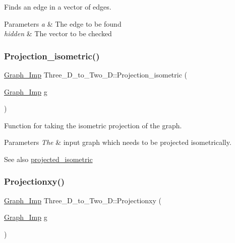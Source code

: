 Finds an edge in a vector of edges. 


\begin{DoxyParams}{Parameters}
{\em a} & The edge to be found \\
\hline
{\em hidden} & The vector to be checked \\
\hline
\end{DoxyParams}
\mbox{\label{class_three___d__to___two___d_a4380f568564cfd30a96bb85bb55a8f55}} 
\subsubsection{\texorpdfstring{Projection\+\_\+isometric()}{Projection\_isometric()}}
{\footnotesize\ttfamily \mbox{\hyperlink{class_graph___imp}{Graph\+\_\+\+Imp}} Three\+\_\+\+D\+\_\+to\+\_\+\+Two\+\_\+\+D\+::\+Projection\+\_\+isometric (\begin{DoxyParamCaption}\item[{\mbox{\hyperlink{class_graph___imp}{Graph\+\_\+\+Imp}}}]{g }\end{DoxyParamCaption})}



Function for taking the isometric projection of the graph. 


\begin{DoxyParams}{Parameters}
{\em The} & input graph which needs to be projected isometrically. \\
\hline
\end{DoxyParams}
\begin{DoxySeeAlso}{See also}
\mbox{\hyperlink{class_three___d__to___two___d_a93664d1beddcbd0153401e363684f2ea}{projected\+\_\+isometric}} 
\end{DoxySeeAlso}
\mbox{\label{class_three___d__to___two___d_a18c70e705fc6f95995c892b0f0b399dd}} 
\subsubsection{\texorpdfstring{Projectionxy()}{Projectionxy()}}
{\footnotesize\ttfamily \mbox{\hyperlink{class_graph___imp}{Graph\+\_\+\+Imp}} Three\+\_\+\+D\+\_\+to\+\_\+\+Two\+\_\+\+D\+::\+Projectionxy (\begin{DoxyParamCaption}\item[{\mbox{\hyperlink{class_graph___imp}{Graph\+\_\+\+Imp}}}]{g }\end{DoxyParamCaption})}



